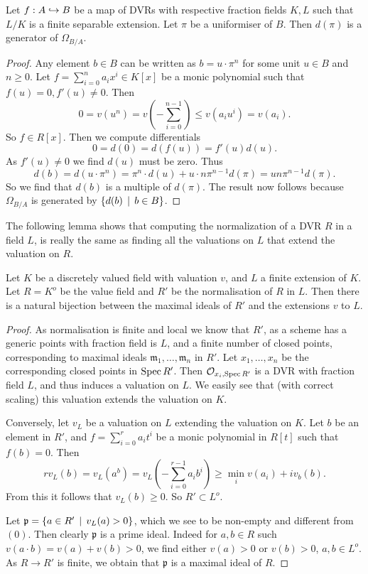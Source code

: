 \begin{lemma}\label{lem:generator_canonical_bundle_DVR}
	Let $f: A \hookrightarrow B$ be a map of DVRs with respective fraction fields $K, L$ such that $L / K$ is a finite separable extension. 
	Let $\pi$ be a uniformiser of $B$. 
	Then $d(\pi)$ is a generator of $\Omega_{B / A}$. 
\end{lemma}
\begin{proof}
	Any element $b \in B$ can be written as $b = u \cdot \pi^{n} $ for some unit $u \in B$ and $n \ge 0$. 
	Let $f = \sum_{i = 0}^{n}  a_i x^{i} \in K[x]$ be a monic polynomial such that $f(u) = 0, f'(u) \ne 0$. 
	Then  \[
		0 = v(u^{n}) = v\left(- \sum_{i = 0}^{n-1}\right) \le v(a_i u^{i}) = v(a_i) 
	.\] 
	So $f \in R[x]$. 
	Then we compute differentials \[
		0 = d(0) = d(f(u)) = f'(u) d(u)
	.\] 
	As $f'(u) \ne 0$ we find $d(u)$ must be zero. 
	Thus \[
		d(b) = d(u\cdot \pi^{n}) = \pi^{n}\cdot d(u) + u\cdot  n \pi^{n-1}d(\pi) = un\pi^{n-1} d(\pi)
	.\] 
	So we find that $d(b)$ is a multiple of $d(\pi)$. 
	The result now follows because $\Omega_{B / A}$ is generated by $\{d(b) \st b \in B\} $.  
\end{proof}

The following lemma shows that computing the normalization of a DVR $R$ in a field $L$, is really the same as finding all the valuations on $L$ that extend the valuation on $R$. 
\begin{lemma}\label{lem:normalisation_extension_norm}
	Let $K$ be a discretely valued field with valuation $v$, and $L$ a finite extension of $K$. 
	Let $R = K^{o}$ be the value field and $R'$ be the normalisation of $R$ in $L$. 
	Then there is a natural bijection between the maximal ideals of $R'$ and the extensions $v $ to $L$. 
\end{lemma}
\begin{proof}
	As normalisation is finite and local we know that $R'$, as a scheme has a generic points with fraction field is $L$, and a finite number of closed points, corresponding to maximal ideals $\mathfrak{m}_1, \ldots, \mathfrak{m} _n $ in $R'$. 
	Let $x_1, \ldots, x_n$ be the corresponding closed points in $\operatorname{Spec} R'$. 
	Then $\mathcal{O}_{x_i, \operatorname{Spec} R'}$ is a DVR with fraction field $L$, and thus induces a valuation on $L$. 
	We easily see that (with correct scaling) this valuation extends the valuation on $K$. 

	Conversely, let $v_L$ be a valuation on $L$ extending the valuation on $K$. 
	Let $b$ be an element in $R'$, and $f = \sum_{i = 0}^{r} a_i t^{i}$ be a monic polynomial in $R[t]$ such that $f(b) = 0$. 
	Then \[
		rv_L(b) = v_L(a^{b}) = v_L \left(-\sum_{i = 0}^{r-1} a_i b^{i}\right) \ge \min_{i} v(a_i) + iv_b(b)
	.\] 
	From this it follows that $v_L(b) \ge 0$. 
	So $R' \subset L^{o}$.  

	Let $\mathfrak{p}  = \{a \in R' \st v_L(a) > 0\} $, which we see to be non-empty and different from $(0)$. 
	Then clearly $\mathfrak{p} $ is a prime ideal.
	Indeed for $a, b \in R$  such $v(a \cdot b) = v(a) + v(b) > 0$, we find either $v(a) > 0$ or $v(b) > 0$, $a, b \in L^{o}$. 
	As $R \to R'$ is finite, we obtain that $\mathfrak{p} $ is a maximal ideal of $R$. 
\end{proof}

